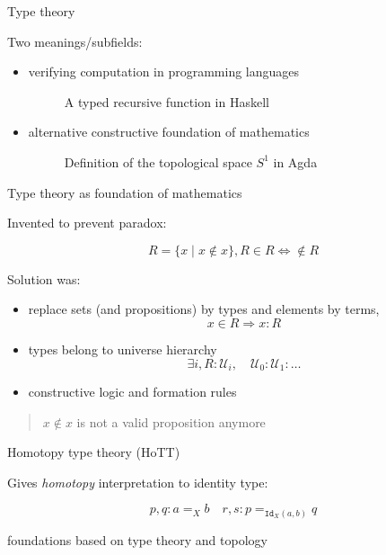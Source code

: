 \documentclass[english,draft]{beamer}
\begin{document}
\begin{frame}{Type theory}
    
    Two meanings/subfields:
    \begin{itemize}
        \item verifying computation in programming languages
        \begin{figure}
            
            \caption{A typed recursive function in Haskell}
        \end{figure}
    
        \pause
        \item alternative constructive foundation of mathematics
        \begin{figure}
            
            \caption{Definition of the topological space $S^1$ in Agda}
        \end{figure}
    
    \end{itemize}

    
\end{frame}

\begin{frame}{Type theory as foundation of mathematics}

Invented to prevent paradox:


    $$ R = \{x \mid x \not \in x \}, R\in R \Leftrightarrow \not \in R $$
    

Solution was:
\begin{itemize}
\item replace sets (and propositions) by types and elements by terms, $$x \in R \Rightarrow x : R$$
\item types belong to universe hierarchy 
        \[\exists i, R : \mathcal{U}_i, \quad \mathcal{U}_0 : \mathcal{U}_1 : \ldots \]
\item constructive logic and formation rules
\end{itemize}

\begin{quotation}
$x \not \in x$ is not a valid proposition anymore
\end{quotation}

\end{frame}

\begin{frame}{}

\end{frame}


\begin{frame}{Homotopy type theory (HoTT)}

Gives \emph{homotopy} interpretation to identity type:

\centering
$$ p,q : a =_X b \quad r,s : p =_{\texttt{Id}_X(a,b)} q$$ 




foundations based on type theory and topology

\end{frame}
\end{document}
